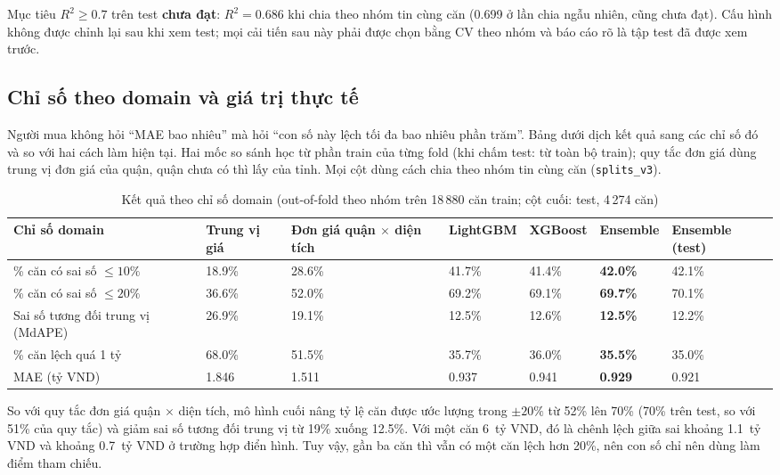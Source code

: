 \documentclass[11pt]{article}
\newcommand{\ty}{tỷ VND}
\begin{document}
\begin{notebox}
Mục tiêu $R^2 \geq 0.7$ trên test \textbf{chưa đạt}: $R^2 = 0.686$ khi chia theo nhóm tin cùng căn (0.699 ở lần
chia ngẫu nhiên, cũng chưa đạt). Cấu hình không được chỉnh lại sau khi xem test; mọi cải tiến sau này phải được chọn
bằng CV theo nhóm và báo cáo rõ là tập test đã được xem trước.
\end{notebox}

\subsection{Chỉ số theo domain và giá trị thực tế}

Người mua không hỏi ``MAE bao nhiêu'' mà hỏi ``con số này lệch tối đa bao nhiêu phần trăm''. Bảng dưới
dịch kết quả sang các chỉ số đó và so với hai cách làm hiện tại. Hai mốc so sánh học từ phần train của
từng fold (khi chấm test: từ toàn bộ train); quy tắc đơn giá dùng trung vị đơn giá của quận, quận chưa có thì
lấy của tỉnh. Mọi cột dùng cách chia theo nhóm tin cùng căn (\texttt{splits\_v3}).

\begin{table}[H]
\centering
\small
\caption{Kết quả theo chỉ số domain (out-of-fold theo nhóm trên 18\,880 căn train; cột cuối: test, 4\,274 căn)}
\begin{tabular}{@{}L{0.15\textwidth}L{0.09\textwidth}L{0.12\textwidth}L{0.125\textwidth}L{0.115\textwidth}L{0.115\textwidth}L{0.11\textwidth}@{}}
\toprule
\textbf{Chỉ số domain} & \textbf{Trung vị giá} & \textbf{Đơn giá quận $\times$ diện tích} & \textbf{LightGBM} & \textbf{XGBoost} & \textbf{Ensemble} & \textbf{Ensemble (test)} \\
\midrule
\% căn có sai số $\leq 10\%$ & 18.9\% & 28.6\% & 41.7\% & 41.4\% & \textbf{42.0\%} & 42.1\% \\
\% căn có sai số $\leq 20\%$ & 36.6\% & 52.0\% & 69.2\% & 69.1\% & \textbf{69.7\%} & 70.1\% \\
Sai số tương đối trung vị (MdAPE) & 26.9\% & 19.1\% & 12.5\% & 12.6\% & \textbf{12.5\%} & 12.2\% \\
\% căn lệch quá 1 tỷ & 68.0\% & 51.5\% & 35.7\% & 36.0\% & \textbf{35.5\%} & 35.0\% \\
MAE (\ty) & 1.846 & 1.511 & 0.937 & 0.941 & \textbf{0.929} & 0.921 \\
\bottomrule
\end{tabular}
\end{table}

So với quy tắc đơn giá quận $\times$ diện tích, mô hình cuối nâng tỷ lệ căn được ước lượng trong $\pm 20\%$ từ
52\% lên 70\% (70\% trên test, so với 51\% của quy tắc) và giảm sai số tương đối trung vị từ 19\% xuống 12.5\%. Với một căn 6~\ty, đó là
chênh lệch giữa sai khoảng 1.1~\ty{} và khoảng 0.7~\ty{} ở trường hợp điển hình. Tuy vậy, gần ba căn thì vẫn có
một căn lệch hơn 20\%, nên con số chỉ nên dùng làm điểm tham chiếu.
\end{document}
